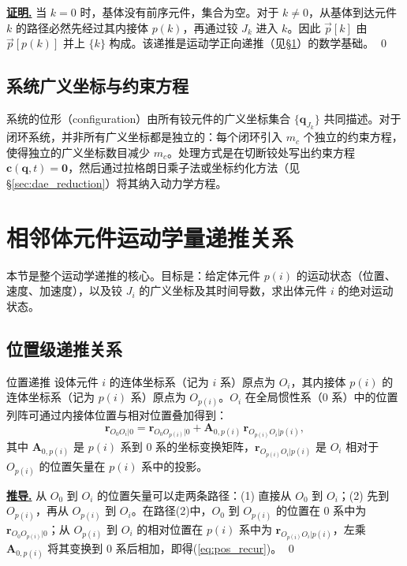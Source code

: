 \documentclass[10pt,a4paper]{book}
\theoremstyle{thmstyle}
\theoremstyle{defstyle}
\theoremstyle{prostyle}
\renewenvironment{proof}[1][证明]{\par{\kaishu \underline{\textbf{#1.}}} \;\fangsong}{\qed\par}
\renewcommand{\vec}[1]{\bm{#1}}
\newcommand{\mat}[1]{\bm{#1}}
\begin{document}
\begin{proof}
当 $k=0$ 时，基体没有前序元件，集合为空。对于 $k \neq 0$，从基体到达元件 $k$ 的路径必然先经过其内接体 $p(k)$，再通过铰 $J_k$ 进入 $k$。因此 $\overrightarrow{p}[k]$ 由 $\overrightarrow{p}[p(k)]$ 并上 $\{k\}$ 构成。该递推是运动学正向递推（见\S\ref{sec:vel_recursion}）的数学基础。
\end{proof}

\subsection{系统广义坐标与约束方程}

系统的位形（configuration）由所有铰元件的广义坐标集合 $\{\vec{q}_{J_k}\}$ 共同描述。对于闭环系统，并非所有广义坐标都是独立的：每个闭环引入 $m_c$ 个独立的约束方程，使得独立的广义坐标数目减少 $m_c$。处理方式是在切断铰处写出约束方程 $\vec{c}(\vec{q},t)=\vec{0}$，然后通过拉格朗日乘子法或坐标约化方法（见\S\ref{sec:dae_reduction}）将其纳入动力学方程。


\section{相邻体元件运动学量递推关系}
\label{sec:vel_recursion}

本节是整个运动学递推的核心。目标是：给定体元件 $p(i)$ 的运动状态（位置、速度、加速度），以及铰 $J_i$ 的广义坐标及其时间导数，求出体元件 $i$ 的绝对运动状态。

\subsection{位置级递推关系}

\begin{mydefinition}{位置递推}
设体元件 $i$ 的连体坐标系（记为 $i$ 系）原点为 $O_i$，其内接体 $p(i)$ 的连体坐标系（记为 $p(i)$ 系）原点为 $O_{p(i)}$。$O_i$ 在全局惯性系（$0$ 系）中的位置列阵可通过内接体位置与相对位置叠加得到：
\begin{equation}
\vec{r}_{O_0O_i|0} = \vec{r}_{O_0O_{p(i)}|0}
+ \mat{A}_{0,p(i)}\,\vec{r}_{O_{p(i)}O_i|p(i)},
\label{eq:pos_recur}
\end{equation}
其中 $\mat{A}_{0,p(i)}$ 是 $p(i)$ 系到 $0$ 系的坐标变换矩阵，$\vec{r}_{O_{p(i)}O_i|p(i)}$ 是 $O_i$ 相对于 $O_{p(i)}$ 的位置矢量在 $p(i)$ 系中的投影。
\end{mydefinition}

\begin{proof}[推导]
从 $O_0$ 到 $O_i$ 的位置矢量可以走两条路径：(1) 直接从 $O_0$ 到 $O_i$；(2) 先到 $O_{p(i)}$，再从 $O_{p(i)}$ 到 $O_i$。在路径(2)中，$O_0$ 到 $O_{p(i)}$ 的位置在 $0$ 系中为 $\vec{r}_{O_0O_{p(i)}|0}$；从 $O_{p(i)}$ 到 $O_i$ 的相对位置在 $p(i)$ 系中为 $\vec{r}_{O_{p(i)}O_i|p(i)}$，左乘 $\mat{A}_{0,p(i)}$ 将其变换到 $0$ 系后相加，即得(\ref{eq:pos_recur})。
\end{proof}
\end{document}
